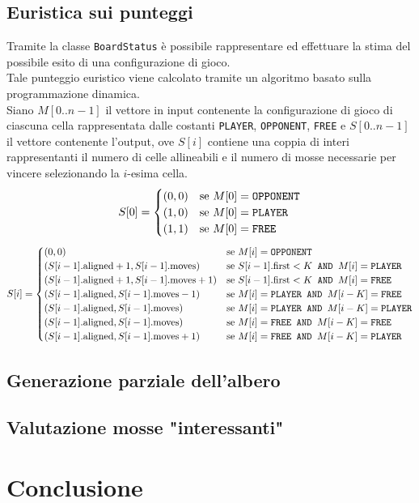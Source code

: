 \documentclass[11pt]{article}
\begin{document}
\subsection{Euristica sui punteggi}
Tramite la classe \texttt{BoardStatus} è possibile rappresentare ed effettuare la stima del possibile esito di una configurazione di gioco.\\
Tale punteggio euristico viene calcolato tramite un algoritmo basato sulla programmazione dinamica.\\
Siano $M[0 .. n-1]$ il vettore in input contenente la configurazione di gioco di ciascuna cella rappresentata dalle costanti \texttt{PLAYER}, \texttt{OPPONENT}, \texttt{FREE} e $S[0 .. n-1]$ il vettore contenente l'output, ove $S[i]$ contiene una coppia di interi rappresentanti il numero di celle allineabili e il numero di mosse necessarie per vincere selezionando la $i$-esima cella.
\begin{equation}
	S[0] = 
	\begin{cases}
	(0,0) & \mbox{se } M[0]=\mbox{\texttt{OPPONENT}} \\ 
	(1,0) & \mbox{se } M[0]=\mbox{\texttt{PLAYER}} \\
	(1,1) & \mbox{se } M[0]=\mbox{\texttt{FREE}}
	\end{cases}
\end{equation}
\begin{equation}
	S[i] = 
	\begin{cases}
	(0,0) & \mbox{se } M[i]=\mbox{\texttt{OPPONENT}} \\ 
	(S[i-1].\text{aligned}+1,S[i-1].\text{moves}) & \mbox{se } S[i-1].\text{first} < K \texttt{ AND } M[i] = \texttt{PLAYER}\\
	(S[i-1].\text{aligned}+1,S[i-1].\text{moves}+1) & \mbox{se } S[i-1].\text{first} < K \texttt{ AND } M[i] = \texttt{FREE}\\
	(S[i-1].\text{aligned},S[i-1].\text{moves}-1) & \mbox{se } M[i]=\texttt{PLAYER AND } M[i-K] =\texttt{FREE}\\
	(S[i-1].\text{aligned},S[i-1].\text{moves}) & \mbox{se } M[i]=\texttt{PLAYER AND } M[i-K] =\texttt{PLAYER}\\
	(S[i-1].\text{aligned},S[i-1].\text{moves}) & \mbox{se } M[i]=\texttt{FREE AND } M[i-K] =\texttt{FREE}\\
	(S[i-1].\text{aligned},S[i-1].\text{moves}+1) & \mbox{se } M[i]=\texttt{FREE AND } M[i-K] =\texttt{PLAYER}\\
	\end{cases}
\end{equation}

\subsection{Generazione parziale dell'albero}
\subsection{Valutazione mosse "interessanti"}
\section{Conclusione}
\end{document}
